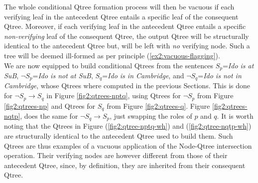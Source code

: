 The whole conditional Qtree formation process will then be vacuous if each verifying leaf in the antecedent Qtree entails a specific leaf of the consequent Qtree. Moreover, if each verifying leaf in the antecedent Qtree entails a specific \textit{non-verifying} leaf of the consequent Qtree, the output Qtree will be structurally identical to the antecedent Qtree but, will be left with \textit{no} verifying node. Such a tree will be deemed ill-formed as per principle (\ref{ex2:vacuous-flagging}). \\

We are now equipped to build conditional Qtrees from the sentences $S_{p}$=\textit{Ido is at SuB}, $\neg S_{p}$=\textit{Ido is not at SuB}, $S_{q}$=\textit{Ido is in Cambridge}, and $\neg S_{q}$=\textit{Ido is not in Cambridge}, whose Qtrees where computed in the previous Sections. This is done for $\neg S_p \rightarrow S_q$ in Figure \ref{fig2:qtrees-nptq}, using Qtrees for $\neg S_p$ from Figure \ref{fig2:qtrees-np} and Qtrees for $S_q$ from Figure \ref{fig2:qtrees-q}. Figure \ref{fig2:qtrees-nqtp}, does the same for $\neg S_q \rightarrow S_p$, just swapping the roles of $p$ and $q$. It is worth noting that the Qtrees in Figure (\ref{fig2:qtree-nptq-wh}) and (\ref{fig2:qtree-nqtp-wh}) are structurally identical to the antecedent Qtree used to build them. Such Qtrees are thus examples of a vacuous application of the Node-Qtree intersection operation. Their verifying nodes are however different from those of their antecedent Qtree, since, by definition, they are inherited from their consequent Qtree. 

